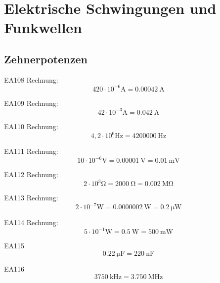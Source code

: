 \setcounter{section}{0}
\section{Elektrische Schwingungen und Funkwellen}

\subsection{Zehnerpotenzen}

\begin{sol}{EA108}
 Rechnung: $$ 420 \cdot 10^{-6}\si{\ampere}  = \SI{0,00042}{\ampere}$$
\end{sol}

\begin{sol}{EA109}
 Rechnung: $$ 42 \cdot 10^{-3}\si{\ampere}  = \SI{0,042}{\ampere}$$
\end{sol}

\begin{sol}{EA110}
 Rechnung: $$ 4,2 \cdot 10^{6}\si{\hertz}  = \SI{4200000}{\hertz}$$
\end{sol}

\begin{sol}{EA111}
 Rechnung: $$ 10 \cdot 10^{-6}\si{\volt}  = \SI{0,00001}{\volt} =\SI{0,01}{\milli\volt}$$
\end{sol}

\begin{sol}{EA112}
 Rechnung: $$ 2 \cdot 10^{3}\si{\ohm}  = \SI{2000}{\ohm} =\SI{0,002}{\mega\ohm}$$
\end{sol}

\begin{sol}{EA113}
 Rechnung: $$ 2 \cdot 10^{-7}\si{\watt}  = \SI{0.0000002}{\watt} =\SI{0,2}{\micro\watt}$$
\end{sol}

\begin{sol}{EA114}
 Rechnung: $$ 5 \cdot 10^{-1}\si{\watt}  = \SI{0.5}{\watt} =\SI{500}{\milli\watt}$$
\end{sol}

\begin{sol}{EA115}
  $$ \SI{0,22}{\micro\farad}  = \SI{220}{\nano\farad} $$
\end{sol}

\begin{sol}{EA116}
  $$ \SI{3750}{\kilo\hertz}  = \SI{3,750}{\mega\hertz} $$
\end{sol}

